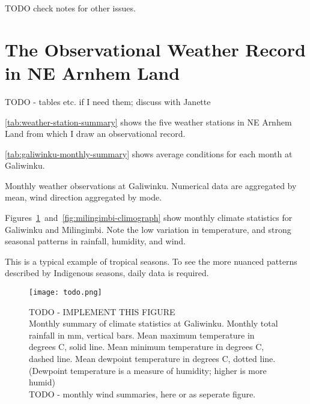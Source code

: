 TODO check notes for other issues.




\section{The Observational Weather Record in NE Arnhem Land}
TODO - tables etc. if I need them; discuss with Janette

\autoref{tab:weather-station-summary} shows the five weather stations in NE
Arnhem Land from which I draw an observational record.

\autoref{tab:galiwinku-monthly-summary} shows average conditions for each
month at Galiwinku.

\begin{landscape}
\begin{table}
    
    \caption[Monthly weather observations at Galiwinku]{
        Monthly weather observations at Galiwinku.
        Numerical data are aggregated by mean, wind direction aggregated by mode.}
    \label{tab:galiwinku-monthly-summary}
\end{table}
\end{landscape}


Figures~\ref{fig:galiwinku-climograph}~and~\ref{fig:milingimbi-climograph}
show monthly climate statistics for Galiwinku and Milingimbi.
Note the low variation in temperature, and strong seasonal patterns in
rainfall, humidity, and wind.

This is a typical example of tropical seasons.  To see the more nuanced
patterns described by Indigenous seasons, daily data is required.

\begin{figure}[h]
    \centering
    \texttt{[image: todo.png]}
    \caption[Monthly Climograph for Galiwinku]{
        TODO - IMPLEMENT THIS FIGURE\\
        Monthly summary of climate statistics at Galiwinku.
        Monthly total rainfall in mm, vertical bars.
        Mean maximum temperature in degrees C, solid line.
        Mean minimum temperature in degrees C, dashed line.
        Mean dewpoint temperature in degrees C, dotted line.
        (Dewpoint temperature is a measure of humidity; higher is more humid)
        ~\\
        TODO - monthly wind summaries, here or as seperate figure.
        }
    \label{fig:galiwinku-climograph}
\end{figure}

